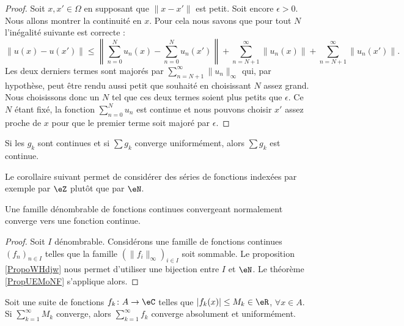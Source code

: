 \begin{proof}
    Soit \( x,x'\in \Omega\) en supposant que \( \| x-x' \|\) est petit. Soit encore \( \epsilon>0\). Nous allons montrer la continuité en \( x\). Pour cela nous savons que pour tout \( N\) l'inégalité suivante est correcte :
    \begin{equation}
        \| u(x)-u(x') \|\leq \left\|  \sum_{n=0}^Nu_n(x)-\sum_{n=0}^{N}u_n(x') \right\|+\sum_{n=N+1}^{\infty}\| u_n(x) \|+\sum_{n=N+1}^{\infty}\| u_n(x') \|.
    \end{equation}
    Les deux derniers termes sont majorés par \( \sum_{n=N+1}^{\infty}\| u_n \|_{\infty}\) qui, par hypothèse, peut être rendu aussi petit que souhaité en choisissant \( N\) assez grand. Nous choisissons donc un \( N\) tel que ces deux termes soient plus petits que \( \epsilon\). Ce \( N\) étant fixé, la fonction \( \sum_{n=0}^{N}u_n\) est continue et nous pouvons choisir \( x'\) assez proche de \( x\) pour que le premier terme soit majoré par \( \epsilon\).
\end{proof}

\begin{theorem}			\label{ThoSerUnifCont}
	Si les $g_k$ sont continues et si $\sum g_k$ converge uniformément, alors $\sum g_k$ est continue.
\end{theorem}

Le corollaire suivant permet de considérer des séries de fonctions indexées par exemple par \( \eZ\) plutôt que par \( \eN\).
\begin{corollary}
    Une famille dénombrable de fonctions continues convergeant normalement converge vers une fonction continue.
\end{corollary}

\begin{proof}
    Soit \( I\) dénombrable. Considérons une famille de fonctions continues \( (f_n)_{n\in I}\) telles que la famille \( (\| f_i \|_{\infty})_{i\in I}\) soit sommable. Le proposition \ref{PropoWHdjw} nous permet d'utiliser une bijection entre \( I\) et \( \eN\). Le théorème \ref{PropUEMoNF} s'applique alors.
\end{proof}

\begin{theorem}		\label{ThoCritWeierstrass}
	Soit une suite de fonctions $f_k\colon A\to \eC$ telles que $| f_k(x) |\leq M_k\in\eR$, $\forall x\in A$. Si $\sum_{k=1}^{\infty}M_k$ converge, alors $\sum_{k=1}^{\infty}f_k$ converge absolument et uniformément.
\end{theorem}

